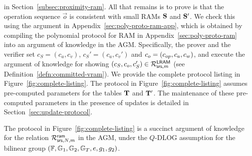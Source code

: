 in Section~\ref{subsec:proximity-ram}.
All that remains is to prove is that the operation sequence $\vec{o}$ is consistent with small RAMs $\mathbf{S}$ and $\mathbf{S}'$.
We check this using the argument in Appendix~\ref{sec:poly-proto-ram-app}, which is obtained by compiling the
polynomial protocol for RAM in Appendix~\ref{sec:poly-proto-ram} into an argument of knowledge in the AGM.
Specifically, the prover and the verifier set
$c_S = (c_a, c_v)$, $c_S'=(c_a, c_v')$ and $c_o = (c_{op}, c_a, c_w)$, and execute the argument of knowledge for
showing $(c_S, c_o, c_S')\in \mathcal{R}^{\mathsf{LRAM}}_{\mathsf{srs},m}$ (see Definition~\ref{defn:committed-vram}). We provide the complete protocol
listing in Figure~\ref{fig:complete-listing}. The protocol in Figure~\ref{fig:complete-listing} assumes pre-computed parameters
for the tables $\mathbf{T}$ and $\mathbf{T}'$. The maintenance of these pre-computed parameters in the presence of updates
is detailed in Section~\ref{sec:update-protocol}.

\begin{theorem}\label{thm:committed-ram}
The protocol in Figure~\ref{fig:complete-listing} is a succinct argument of knowledge for the relation $\mathcal{R}^{\mathsf{ram}}_{\mathsf{srs},N,m}$ in
the AGM, under the $Q$-DLOG assumption for the bilinear group $(\mathbb{F},\mathbb{G}_1,\mathbb{G}_2,\mathbb{G}_T,e,g_1,g_2)$.
\end{theorem}

